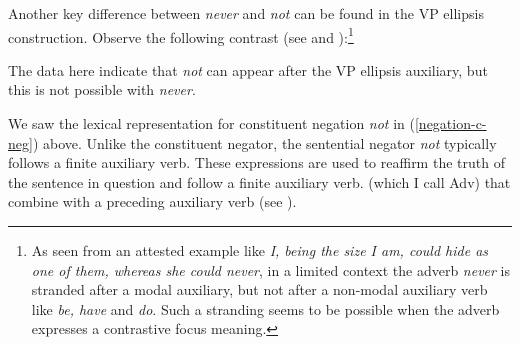 \documentclass[output=paper
 	        ,biblatex
                ,babelshorthands
                ,newtxmath
                ,draftmode
                ,colorlinks, citecolor=brown
]{langscibook}
\begin{document}
\begin{exe}
\begin{xlist}
\begin{exe}
\begin{xlist}
%
%
%
%

Another key difference between \textit{never} and \textit{not} can be found in
the VP ellipsis construction.  Observe the following
contrast (see \citealt{Warner2000a-u} and \citealt{KS:02}):\footnote{As
seen from an attested example like {\it I, being the size I am, could hide as one of them, whereas she could never}, in a limited context the adverb {\it never} is stranded
after a modal auxiliary, but not after a non-modal auxiliary verb like {\it be, have}
and {\it do}. Such a stranding seems to be possible when the adverb
expresses a contrastive focus meaning.}

\eal
\label{negation-vpe-not-ex}
\zl
%
\noindent The data here indicate that \textit{not} can appear
after the VP ellipsis auxiliary, but this is not possible with
\emph{never}.
%
%

We saw the lexical representation for constituent negation
\textit{not} in (\ref{negation-c-neg}) above. Unlike the
constituent negator, the sentential negator \textit{not} typically
 follows a finite auxiliary verb. 
\eal
{}
\zl
%
These expressions are used to
reaffirm the truth of the sentence in question and
follow a finite auxiliary verb.  (which I call Adv) that combine with a
preceding auxiliary verb (see \citealt[--95]{Kim:00}).


\end{xlist}
\end{exe}
\end{xlist}
\end{exe}
\end{document}
